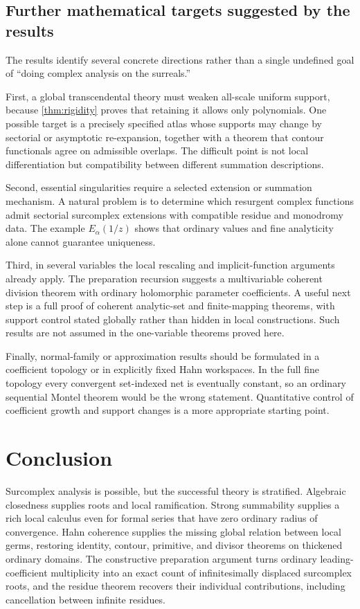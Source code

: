 \documentclass[11pt,letterpaper]{article}
\theoremstyle{definition}
\theoremstyle{remark}
\numberwithin{equation}{section}
\begin{document}
\subsection{Further mathematical targets suggested by the results}
The results identify several concrete directions rather than a single undefined goal of ``doing complex analysis on the surreals.''

First, a global transcendental theory must weaken all-scale uniform support, because \cref{thm:rigidity} proves that retaining it allows only polynomials. One possible target is a precisely specified atlas whose supports may change by sectorial or asymptotic re-expansion, together with a theorem that contour functionals agree on admissible overlaps. The difficult point is not local differentiation but compatibility between different summation descriptions.

Second, essential singularities require a selected extension or summation mechanism. A natural problem is to determine which resurgent complex functions admit sectorial surcomplex extensions with compatible residue and monodromy data. The example $E_\alpha(1/z)$ shows that ordinary values and fine analyticity alone cannot guarantee uniqueness.

Third, in several variables the local rescaling and implicit-function arguments already apply. The preparation recursion suggests a multivariable coherent division theorem with ordinary holomorphic parameter coefficients. A useful next step is a full proof of coherent analytic-set and finite-mapping theorems, with support control stated globally rather than hidden in local constructions. Such results are not assumed in the one-variable theorems proved here.

Finally, normal-family or approximation results should be formulated in a coefficient topology or in explicitly fixed Hahn workspaces. In the full fine topology every convergent set-indexed net is eventually constant, so an ordinary sequential Montel theorem would be the wrong statement. Quantitative control of coefficient growth and support changes is a more appropriate starting point.

\section{Conclusion}
Surcomplex analysis is possible, but the successful theory is stratified. Algebraic closedness supplies roots and local ramification. Strong summability supplies a rich local calculus even for formal series that have zero ordinary radius of convergence. Hahn coherence supplies the missing global relation between local germs, restoring identity, contour, primitive, and divisor theorems on thickened ordinary domains. The constructive preparation argument turns ordinary leading-coefficient multiplicity into an exact count of infinitesimally displaced surcomplex roots, and the residue theorem recovers their individual contributions, including cancellation between infinite residues.
\end{document}
